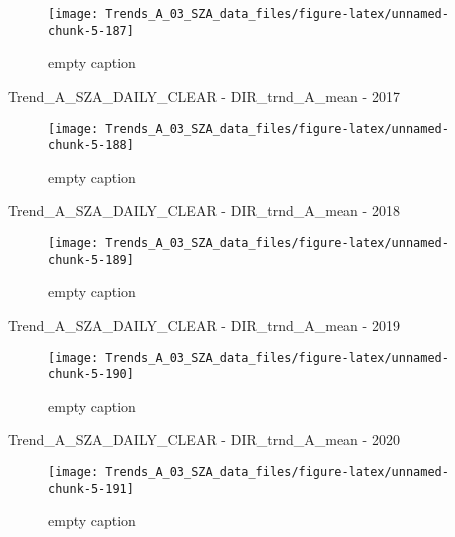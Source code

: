 \documentclass[
  10pt,
  a4paper,oneside]{article}
\begin{document}
\begin{figure}[!ht]

{\centering \texttt{[image: Trends\_A\_03\_SZA\_data\_files/figure-latex/unnamed-chunk-5-187]} 

}

\caption{ empty caption }\label{fig:unnamed-chunk-5-187}
\end{figure}

Trend\_A\_SZA\_DAILY\_CLEAR - DIR\_trnd\_A\_mean - 2017

\begin{figure}[!ht]

{\centering \texttt{[image: Trends\_A\_03\_SZA\_data\_files/figure-latex/unnamed-chunk-5-188]} 

}

\caption{ empty caption }\label{fig:unnamed-chunk-5-188}
\end{figure}

Trend\_A\_SZA\_DAILY\_CLEAR - DIR\_trnd\_A\_mean - 2018

\begin{figure}[!ht]

{\centering \texttt{[image: Trends\_A\_03\_SZA\_data\_files/figure-latex/unnamed-chunk-5-189]} 

}

\caption{ empty caption }\label{fig:unnamed-chunk-5-189}
\end{figure}

Trend\_A\_SZA\_DAILY\_CLEAR - DIR\_trnd\_A\_mean - 2019

\begin{figure}[!ht]

{\centering \texttt{[image: Trends\_A\_03\_SZA\_data\_files/figure-latex/unnamed-chunk-5-190]} 

}

\caption{ empty caption }\label{fig:unnamed-chunk-5-190}
\end{figure}

Trend\_A\_SZA\_DAILY\_CLEAR - DIR\_trnd\_A\_mean - 2020

\begin{figure}[!ht]

{\centering \texttt{[image: Trends\_A\_03\_SZA\_data\_files/figure-latex/unnamed-chunk-5-191]} 

}

\caption{ empty caption }\label{fig:unnamed-chunk-5-191}
\end{figure}
\end{document}
